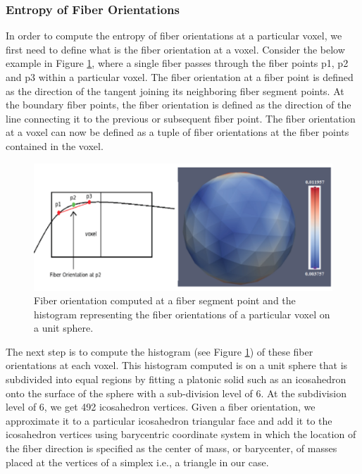 \documentclass{llncs}
\begin{document}
%
\subsubsection{Entropy of Fiber Orientations}
%
In order to compute the entropy of fiber orientations at a particular voxel, we first need to define what is the fiber orientation at a voxel. Consider the below example in Figure \ref{fig:histogram}, where a single fiber passes through the fiber points p1, p2 and p3 within a particular voxel. The fiber orientation at a fiber point is defined as the direction of the tangent joining its neighboring fiber segment points. At the boundary fiber points, the fiber orientation is defined as the direction of the line connecting it to the previous or subsequent fiber point. The fiber orientation at a voxel can now be defined as a tuple of fiber orientations at the fiber points contained in the voxel.

\begin{figure}
\centering
\includegraphics[width=1\columnwidth]{images/fiber_orientation_histogram.png}
\caption{Fiber orientation computed at a fiber segment point and the histogram representing the fiber orientations of a particular voxel on a unit sphere.}
\label{fig:histogram}
\end{figure}
%
The next step is to compute the histogram (see Figure \ref{fig:histogram}) of these fiber orientations at each voxel. This histogram computed is on a unit sphere that is subdivided into equal regions by fitting a platonic solid such as an icosahedron onto the surface of the sphere with a sub-division level of 6.  At the subdivision level of 6, we get 492 icosahedron vertices. Given a fiber orientation, we approximate it to a particular icosahedron triangular face and add it to the icosahedron vertices using barycentric coordinate system in which the location of the fiber direction is specified as the center of mass, or barycenter, of masses placed at the vertices of a simplex i.e., a triangle in our case.
\end{document}
